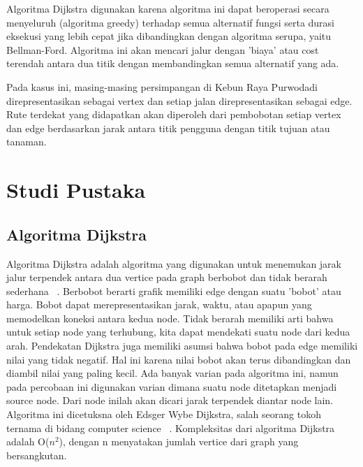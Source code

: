 \documentclass[conference]{IEEEtran}
\begin{document}
Algoritma Dijkstra digunakan karena algoritma ini dapat beroperasi secara menyeluruh (algoritma greedy) terhadap semua alternatif fungsi serta durasi eksekusi yang lebih cepat jika dibandingkan dengan algoritma serupa, yaitu Bellman-Ford. Algoritma ini akan mencari jalur dengan 'biaya' atau cost terendah antara dua titik dengan membandingkan semua alternatif yang ada.

Pada kasus ini, masing-masing persimpangan di Kebun Raya Purwodadi direpresentasikan sebagai vertex dan setiap jalan direpresentasikan sebagai edge. Rute terdekat yang didapatkan akan diperoleh dari pembobotan setiap vertex dan edge berdasarkan jarak antara titik pengguna dengan titik tujuan atau tanaman.
\section{Studi Pustaka}
\subsection{Algoritma Dijkstra}

\begin{figure}[htbp]
    \centering
    \scalebox{0.6}
    {}
\end{figure}


Algoritma Dijkstra adalah algoritma yang digunakan untuk menemukan jarak jalur terpendek antara dua vertice pada graph berbobot dan tidak berarah sederhana ~\cite{rosen2012discrete}. Berbobot berarti grafik memiliki edge dengan suatu 'bobot' atau harga. Bobot dapat merepresentasikan jarak, waktu, atau apapun yang memodelkan koneksi antara kedua node. Tidak berarah memiliki arti bahwa untuk setiap node yang terhubung, kita dapat mendekati suatu node dari kedua arah. Pendekatan Dijkstra juga memiliki asumsi bahwa bobot pada edge memiliki nilai yang tidak negatif. Hal ini karena nilai bobot akan terus dibandingkan dan diambil nilai yang paling kecil. Ada banyak varian pada algoritma ini, namun pada percobaan ini digunakan varian dimana suatu node ditetapkan menjadi source node. Dari node inilah akan dicari jarak terpendek diantar node lain. Algoritma ini dicetuksna oleh Edsger Wybe Dijkstra, salah seorang tokoh ternama di bidang computer science ~\cite{dijkstra1959note}. Kompleksitas dari algoritma Dijkstra adalah O($n^2$), dengan n menyatakan jumlah vertice dari graph yang bersangkutan.
\end{document}
